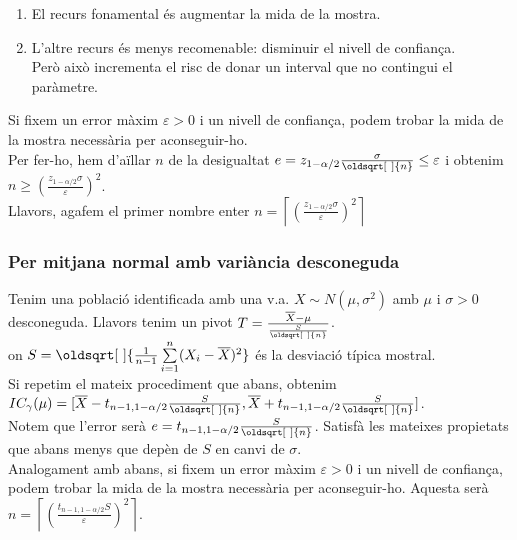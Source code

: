 \documentclass[a4paper]{sciposter}
\renewcommand*{\sqrt}[2][\ ]{\oldsqrt[#1]{#2} }
\begin{document}
\begin{multicols}{3}
\begin{enumerate}
	\begin{enumerate}
		\item El recurs fonamental és augmentar la mida de la mostra.
		\item L'altre recurs és menys recomenable: disminuir el nivell de confiança.\\
		Però això incrementa el risc de donar un interval que no contingui el paràmetre.
	\end{enumerate}
\end{enumerate}
Si fixem un error màxim $\varepsilon > 0$ i un nivell de confiança, podem trobar la mida de la mostra necessària per aconseguir-ho.\\
Per fer-ho, hem d'aïllar $n$ de la desigualtat $e = z_{1-\alpha/2}\frac{\sigma}{\sqrt{n}} \leq \varepsilon$ i obtenim $n \geq \left(\frac{z_{1-\alpha/2}\sigma}{\varepsilon}\right)^2$.\\
Llavors, agafem el primer nombre enter $n = \left\lceil\left(\frac{z_{1-\alpha/2}\sigma}{\varepsilon}\right)^2\right\rceil$
\subsubsection{Per mitjana normal amb variància desconeguda}
Tenim una població identificada amb una v.a. $X \sim N(\mu, \sigma^2)$ amb $\mu$ i $\sigma > 0$ desconeguda. Llavors tenim un pivot $T = \frac{\overline{X} - \mu}{\frac{S}{\sqrt{n}}}$.\\
on $S = \sqrt{\frac{1}{n-1}\sum\limits_{i=1}^n(X_i - \overline{X})^2}$ és la desviació típica mostral.\\
Si repetim el mateix procediment que abans, obtenim $IC_\gamma(\mu) = [\overline{X} - t_{n-1,1-\alpha/2}\frac{S}{\sqrt{n}}, \overline{X} + t_{n-1,1-\alpha/2}\frac{S}{\sqrt{n}}]$.\\
Notem que l'error serà $e = t_{n-1,1-\alpha/2}\frac{S}{\sqrt{n}}$. Satisfà les mateixes propietats que abans menys que depèn de $S$ en canvi de $\sigma$.\\
Analogament amb abans, si fixem un error màxim $\varepsilon > 0$ i un nivell de confiança, podem trobar la mida de la mostra necessària per aconseguir-ho. Aquesta serà $n = \left\lceil\left(\frac{t_{n-1,1-\alpha/2}S}{\varepsilon}\right)^2\right\rceil$.

\end{multicols}
\end{document}

